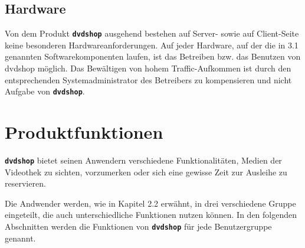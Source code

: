 \documentclass[12pt,oneside,a4paper,bibtotoc,liststotoc,pointlessnumbers]{scrartcl}
\begin{document}
\subsection{Hardware}
Von dem Produkt \texttt{\textbf{dvdshop}} ausgehend bestehen auf Server- sowie auf Client-Seite keine besonderen Hardwareanforderungen. Auf jeder Hardware, auf der die in 3.1 genannten Softwarekomponenten laufen, ist das Betreiben bzw. das Benutzen von dvdshop möglich. Das Bewältigen von hohem Traffic-Aufkommen ist durch den entsprechenden Systemadministrator des Betreibers zu kompensieren und nicht Aufgabe von \texttt{\textbf{dvdshop}}.

\newpage
\section{Produktfunktionen}
\texttt{\textbf{dvdshop}} bietet seinen Anwendern verschiedene Funktionalitäten, Medien der Videothek zu sichten, vorzumerken oder sich eine gewisse Zeit zur Ausleihe zu reservieren.\par
Die Andwender werden, wie in Kapitel 2.2 erwähnt, in drei verschiedene Gruppe eingeteilt, die auch unterschiedliche Funktionen nutzen können. In den folgenden Abschnitten werden die Funktionen von \texttt{\textbf{dvdshop}} für jede Benutzergruppe genannt.
\end{document}
